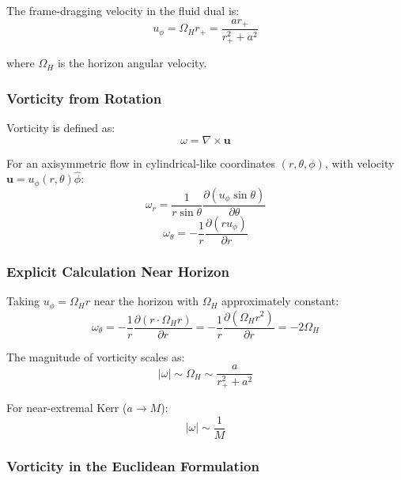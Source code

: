 \documentclass[11pt]{article}
\begin{document}
The frame-dragging velocity in the fluid dual is:
\begin{equation}
u_\phi = \Omega_H r_+ = \frac{a r_+}{r_+^2 + a^2}
\end{equation}

where $\Omega_H$ is the horizon angular velocity.

\subsubsection{Vorticity from Rotation}

Vorticity is defined as:
\begin{equation}
\omega = \nabla \times \mathbf{u}
\end{equation}

For an axisymmetric flow in cylindrical-like coordinates $(r, \theta, \phi)$, with velocity $\mathbf{u} = u_\phi(r,\theta)\hat{\phi}$:
\begin{equation}
\omega_r = \frac{1}{r\sin\theta}\frac{\partial(u_\phi \sin\theta)}{\partial\theta}
\end{equation}
\begin{equation}
\omega_\theta = -\frac{1}{r}\frac{\partial(r u_\phi)}{\partial r}
\end{equation}

\subsubsection{Explicit Calculation Near Horizon}

Taking $u_\phi = \Omega_H r$ near the horizon with $\Omega_H$ approximately constant:
\begin{equation}
\omega_\theta = -\frac{1}{r}\frac{\partial(r \cdot \Omega_H r)}{\partial r} = -\frac{1}{r}\frac{\partial(\Omega_H r^2)}{\partial r} = -2\Omega_H
\end{equation}

The magnitude of vorticity scales as:
\begin{equation}
|\omega| \sim \Omega_H \sim \frac{a}{r_+^2 + a^2}
\end{equation}

For near-extremal Kerr ($a \to M$):
\begin{equation}
|\omega| \sim \frac{1}{M}
\end{equation}

\subsubsection{Vorticity in the Euclidean Formulation}
\end{document}
